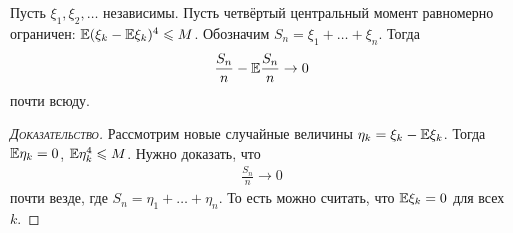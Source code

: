 \documentclass[../main.tex]{subfiles}
\begin{document}
\begin{thm}
 Пусть $ \xi_1, \xi_2, \ldots $ независимы. Пусть четвёртый центральный момент равномерно ограничен: $ \mathbb E (\xi_k - \mathbb E\xi_k)^{4} \leqslant M $. Обозначим $ S_n = \xi_1 + \ldots + \xi_n $. Тогда
 \begin{align*}
  \frac{S_n}{n} - \mathbb E \frac{S_n}{n} \to 0
 \end{align*} почти всюду.
\end{thm}
\begin{proof}[\normalfont\textsc{Доказательство}]
 Рассмотрим новые случайные величины $ \eta_k = \xi_k - \mathbb E\xi_k $. Тогда $ \mathbb E\eta_k = 0 $, $ \mathbb E \eta_k^{4} \leqslant M $. Нужно доказать, что
 \begin{align*}
  \frac{S_n}{n} \to 0
 \end{align*} почти везде, где $ S_n = \eta_1 + \ldots + \eta_n $. То есть можно считать, что $ \mathbb E \xi_k = 0 $ для всех $ k $.


\end{proof}
\end{document}
